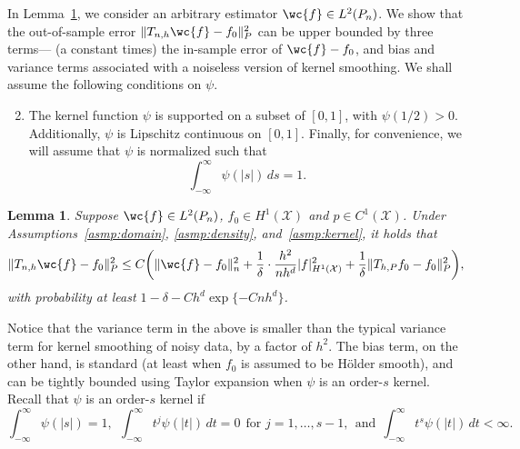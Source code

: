 \documentclass{article}
\newcommand{\1}{\mathbf{1}}
\newcommand{\mc}[1]{\mathcal{#1}}
\theoremstyle{alden}
\theoremstyle{aldenthm}
\newtheorem{lemma}{Lemma}
\theoremstyle{definition}
\theoremstyle{remark}
\begin{document}
In Lemma~\ref{lem:kernel_smoothing_laplacian_eigenmaps}, we consider an arbitrary estimator $\wc{f} \in L^2(P_n)$. We show that the out-of-sample error $\|T_{n,h}\wc{f} - f_0\|_P^2$ can be upper bounded by three terms--- (a constant times) the in-sample error of $\wc{f} - f_0$, and bias and variance terms associated with a noiseless version of kernel smoothing. We shall assume the following conditions on $\psi$.
\begin{enumerate}[label=(K\arabic*)]
	\setcounter{enumi}{1}
	\item
	\label{asmp:kernel}
	The kernel function $\psi$ is supported on a subset of $[0,1]$, with $\psi(1/2) > 0$. Additionally, $\psi$ is Lipschitz continuous on $[0,1]$. Finally, for convenience, we will assume that $\psi$ is normalized such that
	\begin{equation*}
	\int_{-\infty}^{\infty} \psi(|s|) \,ds = 1.
	\end{equation*}
\end{enumerate}
\begin{lemma}
	\label{lem:kernel_smoothing_laplacian_eigenmaps}
	Suppose $\wc{f} \in L^2(P_n)$, $f_0 \in H^1(\mc{X})$ and $p \in C^1(\mc{X})$. Under Assumptions~\ref{asmp:domain}, \ref{asmp:density}, and~\ref{asmp:kernel}, it holds that
	\begin{equation}
	\label{eqn:kernel_smoothing_laplacian_eigenmaps}
	\|T_{n,h}\wc{f} - f_0\|_P^2 \leq C\biggl(\|\wc{f} - f_0\|_n^2 + \frac{1}{\delta} \cdot \frac{h^2}{nh^d} |f|_{H^1(\mc{X})}^2 + \frac{1}{\delta}\|T_{h,P}f_0 - f_0\|_P^2\biggr),
	\end{equation}
	with probability at least $1 - \delta - Ch^d\exp\{-Cnh^d\}$. 
\end{lemma}
Notice that the variance term in the above is smaller than the typical variance term for kernel smoothing of noisy data, by a factor of $h^2$. The bias term, on the other hand, is standard (at least when $f_0$ is assumed to be H\"{o}lder smooth), and can be tightly bounded using Taylor expansion when $\psi$ is an order-$s$ kernel. Recall that $\psi$ is an order-$s$ kernel if
\begin{equation*}
\int_{-\infty}^{\infty} \psi(|s|) = 1,~~\int_{-\infty}^{\infty} t^j \psi(|t|) \,dt = 0~~\textrm{for $j = 1,\ldots,s - 1$},~~\textrm{and}~~\int_{-\infty}^{\infty} t^s \psi(|t|) \,dt < \infty.
\end{equation*}
\end{document}
